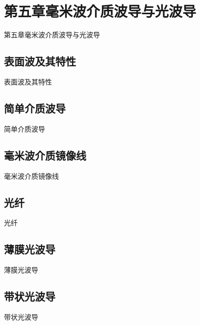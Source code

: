 \section{第五章\quad 毫米波介质波导与光波导}
\begin{frame}{第五章\quad 毫米波介质波导与光波导}

\end{frame}

\subsection{表面波及其特性}
\begin{frame}{表面波及其特性}

\end{frame}

\subsection{简单介质波导}
\begin{frame}{简单介质波导}

\end{frame}

\subsection{毫米波介质镜像线}
\begin{frame}{毫米波介质镜像线}

\end{frame}

\subsection{光纤}
\begin{frame}{光纤}

\end{frame}

\subsection{薄膜光波导}
\begin{frame}{薄膜光波导}

\end{frame}

\subsection{带状光波导}
\begin{frame}{带状光波导}

\end{frame}
